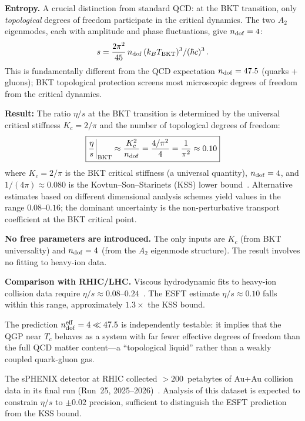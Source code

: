 ﻿\documentclass[twocolumn,showpacs,preprintnumbers,amsmath,amssymb,prd]{revtex4-2}
\begin{document}
\textbf{Entropy.} A crucial distinction from standard QCD: at the BKT transition, only \emph{topological} degrees of freedom participate in the critical dynamics. The two $A_2$ eigenmodes, each with amplitude and phase fluctuations, give $n_{\rm dof} = 4$:
\begin{equation}
s = \frac{2\pi^2}{45}\,n_{\rm dof}\,(k_B T_{\rm BKT})^3 / (\hbar c)^3\,.
\label{eq:s_BKT}
\end{equation}
This is fundamentally different from the QCD expectation $n_{\rm dof} = 47.5$ (quarks + gluons); BKT topological protection screens most microscopic degrees of freedom from the critical dynamics.

\textbf{Result:}
The ratio $\eta/s$ at the BKT transition is determined by the universal critical stiffness $K_c = 2/\pi$ and the number of topological degrees of freedom:
\begin{equation}
\boxed{\frac{\eta}{s}\bigg|_{\rm BKT} \approx \frac{K_c^2}{n_{\rm dof}} = \frac{4/\pi^2}{4} = \frac{1}{\pi^2} \approx 0.10}
\label{eq:eta_s}
\end{equation}
where $K_c = 2/\pi$ is the BKT critical stiffness (a universal quantity), $n_{\rm dof} = 4$, and $1/(4\pi) \approx 0.080$ is the Kovtun--Son--Starinets (KSS) lower bound~\cite{KSS2005}. Alternative estimates based on different dimensional analysis schemes yield values in the range $0.08$--$0.16$; the dominant uncertainty is the non-perturbative transport coefficient at the BKT critical point.

\textbf{No free parameters are introduced.} The only inputs are $K_c$ (from BKT universality) and $n_{\rm dof} = 4$ (from the $A_2$ eigenmode structure). The result involves no fitting to heavy-ion data.

\textbf{Comparison with RHIC/LHC.} Viscous hydrodynamic fits to heavy-ion collision data require $\eta/s \approx 0.08$--$0.24$~\cite{RHIC2005,Bernhard2019}. The ESFT estimate $\eta/s \approx 0.10$ falls within this range, approximately $1.3\times$ the KSS bound.

The prediction $n_{\rm dof}^{\rm eff} = 4 \ll 47.5$ is independently testable: it implies that the QGP near $T_c$ behaves as a system with far fewer effective degrees of freedom than the full QCD matter content---a ``topological liquid'' rather than a weakly coupled quark-gluon gas.

The sPHENIX detector at RHIC collected $> 200$~petabytes of Au+Au collision data in its final run (Run~25, 2025--2026)~\cite{sPHENIX2025}. Analysis of this dataset is expected to constrain $\eta/s$ to $\pm 0.02$ precision, sufficient to distinguish the ESFT prediction from the KSS bound.
\end{document}
